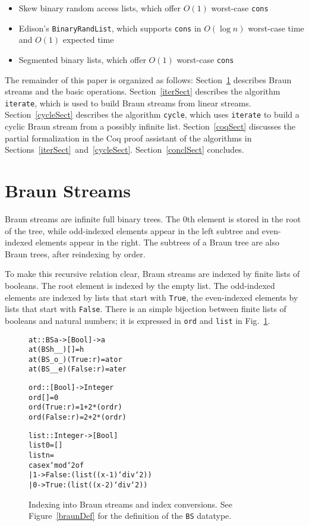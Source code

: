 \documentclass[envcountsect]{llncs}
\begin{document}
\begin{itemize}
\item Skew binary random access lists, which offer $O(1)$ worst-case {\tt cons} \cite{okasakiSkewLists}
\item Edison's \verb|BinaryRandList|, which supports {\tt cons} in $O(\log n)$ worst-case time and $O(1)$ expected time \cite{edison,holtersThesis}
\item Segmented binary lists, which offer $O(1)$ worst-case {\tt cons} \cite{okasakiThesis}
\end{itemize}


The remainder of this paper is organized as follows: 
Section~\ref{braunSect} describes Braun streams and the basic operations.
Section~\ref{iterSect} describes the algorithm {\tt iterate}, which is used to build Braun streams from linear streams.
Section~\ref{cycleSect} describes the algorithm {\tt cycle}, which uses {\tt iterate} to build a cyclic Braun stream from a possibly infinite list.
Section~\ref{coqSect} discusses the partial formalization in the Coq proof assistant of the algorithms in Sections~\ref{iterSect}~and~\ref{cycleSect}.
Section~\ref{conclSect} concludes.

\section{Braun Streams}
\label{braunSect}

Braun streams are infinite full binary trees.
The $0$th element is stored in the root of the tree, while odd-indexed elements appear in the left subtree and even-indexed elements appear in the right.
The subtrees of a Braun tree are also Braun trees, after reindexing by order.

To make this recursive relation clear, Braun streams are indexed by finite lists of booleans.
The root element is indexed by the empty list.
The odd-indexed elements are indexed by lists that start with \verb|True|, the even-indexed elements by lists that start with \verb|False|.
There is an simple bijection between finite lists of booleans and natural numbers;
it is expressed in \verb|ord| and \verb|list| in Fig.~\ref{basicCode}.

\begin{figure}
\begin{alltt}
at :: BS a -> [Bool] -> a
at (BS h _ _) [] = h
at (BS _ o _) (True:r) = at o r
at (BS _ _ e) (False:r) = at e r

ord :: [Bool] -> Integer
ord [] = 0
ord (True:r) = 1 + 2*(ord r)
ord (False:r) = 2 + 2*(ord r)

list :: Integer -> [Bool]
list 0 = []
list n = 
    case x `mod` 2 of
      | 1 -> False:(list ((x-1)`div`2))
      | 0 -> True:(list ((x-2)`div`2))
\end{alltt}
\caption{Indexing into Braun streams and index conversions.
See Figure~\ref{braunDef} for the definition of the {\tt BS} datatype.}
\label{basicCode}
\end{figure}
\end{document}
